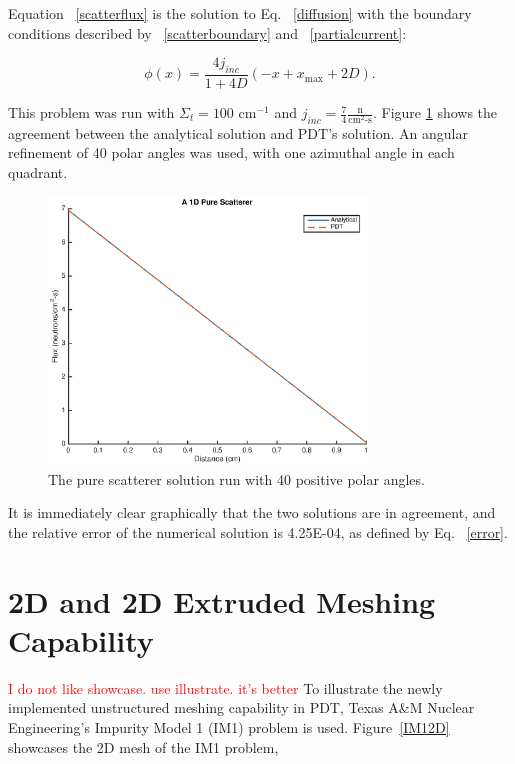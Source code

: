 \documentclass{anstrans}
\newcommand{\tcr}[1]{\textcolor{red}{#1}}
\begin{document}
Equation ~\eqref{scatterflux} is the solution to Eq. ~\eqref{diffusion} with the boundary conditions described by ~\eqref{scatterboundary} and ~\eqref{partialcurrent}:

\begin{equation}
\phi(x) = \frac{4j_{inc}}{1+4D}(-x + x_{\text{max}} + 2D).
\label{scatterflux}
\end{equation}

This problem was run with $\Sigma_t = 100 \text{ cm}^{-1}$ and $j_{inc} = \frac{7}{4} \frac{\text{n}}{\text{cm}^2\text{-s}}$. Figure \ref{scattersoln} shows the agreement between the analytical solution and PDT's solution. An angular refinement of 40 polar angles was used, with one azimuthal angle in each quadrant.

\begin{figure}
\centering
\includegraphics[width=85mm]{figures/PureScatterer.eps}
\caption{The pure scatterer solution run with 40 positive polar angles.}
\label{scattersoln}
\end{figure}

It is immediately clear graphically that the two solutions are in agreement, and the relative error of the numerical solution is 4.25E-04, as defined by Eq. ~\eqref{error}.

\section{2D and 2D Extruded Meshing Capability}

\tcr{I do not like showcase. use illustrate. it's better}
To illustrate the newly implemented unstructured meshing capability in PDT, Texas A\&M Nuclear Engineering's Impurity Model 1 (IM1) problem is used. Figure~\ref{IM12D} showcases the 2D mesh of the IM1 problem,
\end{document}
